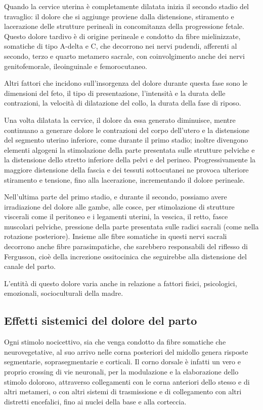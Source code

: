 \documentclass[]{article}
\begin{document}
Quando la cervice uterina è completamente dilatata inizia il secondo
stadio del travaglio: il dolore che si aggiunge proviene dalla
distensione, stiramento e lacerazione delle strutture perineali in
concomitanza della progressione fetale. Questo dolore tardivo è di
origine perineale e condotto da fibre mielinizzate, somatiche di tipo
A-delta e C, che decorrono nei nervi pudendi, afferenti al secondo,
terzo e quarto metamero sacrale, con coinvolgimento anche dei nervi
genitofemorale, ileoinguinale e femorocutaneo.

Altri fattori che incidono sull'insorgenza del dolore durante questa
fase sono le dimensioni del feto, il tipo di presentazione, l'intensità
e la durata delle contrazioni, la velocità di dilatazione del collo, la
durata della fase di riposo.

Una volta dilatata la cervice, il dolore da essa generato diminuisce,
mentre continuano a generare dolore le contrazioni del corpo dell'utero
e la distensione del segmento uterino inferiore, come durante il primo
stadio; inoltre divengono elementi algogeni la stimolazione della parte
presentata sulle strutture pelviche e la distensione dello stretto
inferiore della pelvi e del perineo. Progressivamente la maggiore
distensione della fascia e dei tessuti sottocutanei ne provoca ulteriore
stiramento e tensione, fino alla lacerazione, incrementando il dolore
perineale.

Nell'ultima parte del primo stadio, e durante il secondo, possiamo avere
irradiazione del dolore alle gambe, alle cosce, per stimolazione di
strutture viscerali come il peritoneo e i legamenti uterini, la vescica,
il retto, fasce muscolari pelviche, pressione della parte presentata
sulle radici sacrali (come nella rotazione posteriore). Insieme alle
fibre somatiche in questi nervi sacrali decorrono anche fibre
parasimpatiche, che sarebbero responsabili del riflesso di Fergusson,
cioè della increzione ossitocinica che seguirebbe alla distensione del
canale del parto.

L'entità di questo dolore varia anche in relazione a fattori fisici,
psicologici, emozionali, socioculturali della madre.

\hypertarget{effetti-sistemici-del-dolore-del-parto}{%
\subsection{Effetti sistemici del dolore del
parto}\label{effetti-sistemici-del-dolore-del-parto}}

Ogni stimolo nocicettivo, sia che venga condotto da fibre somatiche che
neurovegetative, al suo arrivo nelle corna posteriori del midollo genera
risposte segmentarie, soprasegmentarie e corticali. Il corno dorsale è
infatti un vero e proprio crossing di vie neuronali, per la modulazione
e la elaborazione dello stimolo doloroso, attraverso collegamenti con le
corna anteriori dello stesso e di altri metameri, o con altri sistemi di
trasmissione e di collegamento con altri distretti encefalici, fino ai
nuclei della base e alla corteccia.
\end{document}
